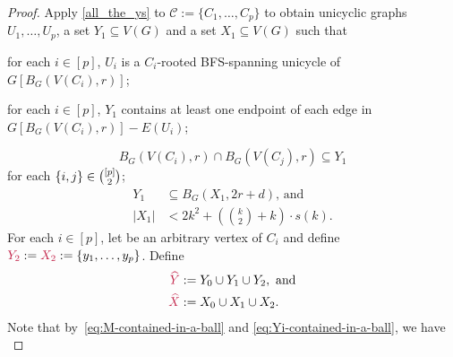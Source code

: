 \documentclass{patmorin}
\newcommand{\pat}[1]{\textcolor{Blue}{[Pat: #1]}}
\newcommand{\gwen}[1]{\textcolor{Purple}{Gwen: #1}}
\DeclarePairedDelimiter\set{\{}{\}}
\begin{document}
\begin{proof}
Apply \cref{all_the_ys} to $\mathcal{C}:=\{C_1,\ldots,C_p\}$ to obtain unicyclic graphs $U_1,\ldots,U_p$, a set
 $Y_1\subseteq V(G)$ and a set $X_1\subseteq V(G)$ such that 
    \begin{tightenum}%
      \item for each $i\in[p]$, $U_i$ is a  $C_i$-rooted BFS-spanning unicycle of $G[B_G(V(C_i),r)]$;
      \item for each $i\in[p]$, $Y_1$
      contains at least one endpoint of each edge in $G[B_G(V(C_i),r)]- E(U_i)$; 
\end{tightenum}
\begin{equation}
B_{G}(V(C_i),r)\cap B_{G}(V(C_j),r)\subseteq Y_1
\end{equation}
for each $\set{i,j}\in\binom{[p]}{2}$; 
\begin{align}
Y_1&\subseteq B_G(X_1,2r+d)\text{, and} \label{eq:Yi-contained-in-a-ball}\\
|X_1|&<\textstyle  2k^2+ (\binom{k}{2}+k)\cdot s(k). \label{eq:Xi-size}
\end{align}
For each $i\in[p]$, let  be an arbitrary vertex of $C_i$ and define $\mathdefin{Y_2}:=\mathdefin{X_2}:=\{y_1,\ldots,y_p\}$.
Define 
\begin{align*}
  \mathdefin{\widehat{Y}}&:= \textstyle Y_0 \cup Y_1 \cup Y_2,\ \textrm{and}\\
  \mathdefin{\widehat{X}}&:=\textstyle X_0\cup X_1\cup X_2.
\end{align*}
Note that by~\eqref{eq:M-contained-in-a-ball} and \eqref{eq:Yi-contained-in-a-ball}, we have
\begin{equation}\label{m_in_x_ball}

\end{equation}
\end{proof}
\end{document}

